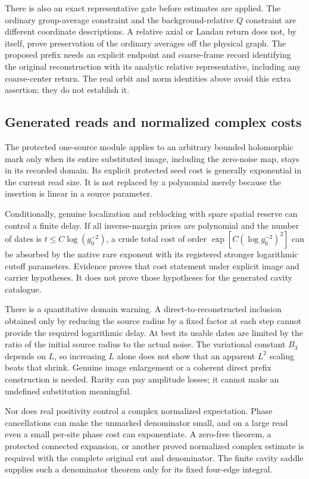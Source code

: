 There is also an exact representative gate before estimates are applied. The ordinary group-average constraint and the background-relative $Q$ constraint are different coordinate descriptions. A relative axial or Landau return does not, by itself, prove preservation of the ordinary averages off the physical graph. The proposed prefix needs an explicit endpoint and coarse-frame record identifying the original reconstruction with its analytic relative representative, including any coarse-center return. The real orbit and norm identities above avoid this extra assertion; they do not establish it.

\subsection{Generated reads and normalized complex costs}

The protected one-source module applies to an arbitrary bounded holomorphic mark only when its entire substituted image, including the zero-noise map, stays in its recorded domain. Its explicit protected seed cost is generally exponential in the current read size. It is not replaced by a polynomial merely because the insertion is linear in a source parameter.

Conditionally, genuine localization and reblocking with spare spatial reserve can control a finite delay. If all inverse-margin prices are polynomial and the number of dates is $t\le C\log(g_0^{-2})$, a crude total cost of order $\exp[C(\log g_0^{-2})^2]$ can be absorbed by the native rare exponent with its registered stronger logarithmic cutoff parameters. Evidence  proves that cost statement under explicit image and carrier hypotheses. It does not prove those hypotheses for the generated cavity catalogue.

There is a quantitative domain warning. A direct-to-reconstructed inclusion obtained only by reducing the source radius by a fixed factor at each step cannot provide the required logarithmic delay. At best its usable dates are limited by the ratio of the initial source radius to the actual noise. The variational constant $B_3$ depends on $L$, so increasing $L$ alone does not show that an apparent $L^2$ scaling beats that shrink. Genuine image enlargement or a coherent direct prefix construction is needed. Rarity can pay amplitude losses; it cannot make an undefined substitution meaningful.

Nor does real positivity control a complex normalized expectation. Phase cancellations can make the unmarked denominator small, and on a large read even a small per-site phase cost can exponentiate. A zero-free theorem, a protected connected expansion, or another proved normalized complex estimate is required with the complete original cut and denominator. The finite cavity saddle supplies such a denominator theorem only for its fixed four-edge integral.

